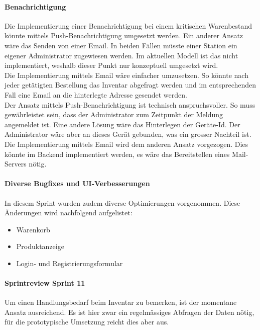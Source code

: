 \paragraph{Benachrichtigung}
Die Implementierung einer Benachrichtigung bei einem kritischen Warenbestand könnte mittels Push-Benachrichtigung umgesetzt werden. Ein anderer Ansatz wäre das Senden von einer Email. In beiden Fällen müsste einer Station ein eigener Administrator zugewiesen werden. Im aktuellen Modell ist das nicht implementiert, weshalb dieser Punkt nur konzeptuell umgesetzt wird. \\
Die Implementierung mittels Email wäre einfacher umzusetzen. So könnte nach jeder getätigten Bestellung das Inventar abgefragt werden und im entsprechenden Fall eine Email an die hinterlegte Adresse gesendet werden. \\
Der Ansatz mittels Push-Benachrichtigung ist technisch anspruchsvoller. So muss gewährleistet sein, dass der Administrator zum Zeitpunkt der Meldung angemeldet ist. Eine andere Lösung wäre das Hinterlegen der Geräte-Id. Der Administrator wäre aber an dieses Gerät gebunden, was ein grosser Nachteil ist. \\

Die Implementierung mittels Email wird dem anderen Ansatz vorgezogen. Dies könnte im Backend implementiert werden, es wäre das Bereitstellen eines Mail-Servers nötig. \\
\newpage
\paragraph{Diverse Bugfixes und UI-Verbesserungen}
In diesem Sprint wurden zudem diverse Optimierungen vorgenommen. Diese Änderungen wird nachfolgend aufgelistet: 
\begin{itemize}
	\item Warenkorb
	\item Produktanzeige
	\item Login- und Registrierungsformular
\end{itemize}


\paragraph{Sprintreview Sprint 11}
Um einen Handlungsbedarf beim Inventar zu bemerken, ist der momentane Ansatz ausreichend. Es ist hier zwar ein regelmässiges Abfragen der Daten nötig, für die prototypische Umsetzung reicht dies aber aus. 
